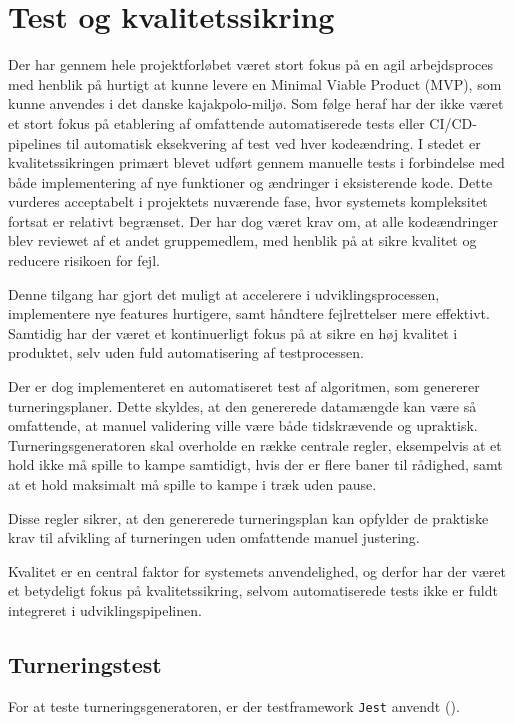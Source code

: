 \section{Test og kvalitetssikring}

Der har gennem hele projektforløbet været stort fokus på en agil arbejdsproces med henblik på hurtigt at kunne levere en Minimal Viable Product (MVP), som kunne anvendes i det danske kajakpolo-miljø.
Som følge heraf har der ikke været et stort fokus på etablering af omfattende automatiserede tests eller CI/CD-pipelines til automatisk eksekvering af test ved hver kodeændring.
I stedet er kvalitetssikringen primært blevet udført gennem manuelle tests i forbindelse med både implementering af nye funktioner og ændringer i eksisterende kode.
Dette vurderes acceptabelt i projektets nuværende fase, hvor systemets kompleksitet fortsat er relativt begrænset.
Der har dog været krav om, at alle kodeændringer blev reviewet af et andet gruppemedlem, med henblik på at sikre kvalitet og reducere risikoen for fejl.

Denne tilgang har gjort det muligt at accelerere i udviklingsprocessen, implementere nye features hurtigere, samt håndtere fejlrettelser mere effektivt.
Samtidig har der været et kontinuerligt fokus på at sikre en høj kvalitet i produktet, selv uden fuld automatisering af testprocessen.

Der er dog implementeret en automatiseret test af algoritmen, som genererer turneringsplaner.
Dette skyldes, at den genererede datamængde kan være så omfattende, at manuel validering ville være både tidskrævende og upraktisk.
Turneringsgeneratoren skal overholde en række centrale regler, eksempelvis at et hold ikke må spille to kampe samtidigt, hvis der er flere baner til rådighed,
samt at et hold maksimalt må spille to kampe i træk uden pause.

Disse regler sikrer, at den genererede turneringsplan kan opfylder de praktiske krav til afvikling af turneringen uden omfattende manuel justering.

Kvalitet er en central faktor for systemets anvendelighed, og derfor har der været et betydeligt fokus på kvalitetssikring, selvom automatiserede tests ikke er fuldt integreret i udviklingspipelinen.

\subsection{Turneringstest}
For at teste turneringsgeneratoren, er der testframework \texttt{Jest} anvendt (\cite{Jest}).

